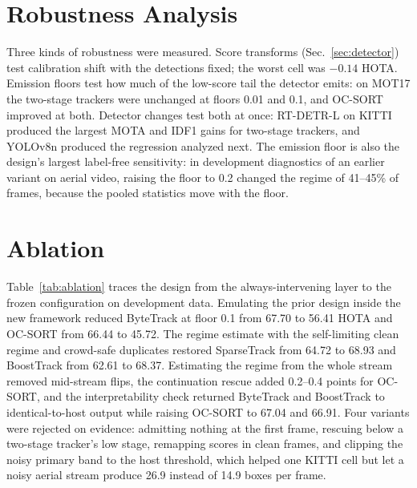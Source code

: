 \documentclass[journal]{new-aiaa}
\begin{document}
\section{Robustness Analysis}\label{sec:robust}
Three kinds of robustness were measured. Score transforms (Sec.~\ref{sec:detector}) test calibration shift with the detections fixed; the worst cell was $-0.14$ HOTA. Emission floors test how much of the low-score tail the detector emits: on MOT17 the two-stage trackers were unchanged at floors 0.01 and 0.1, and OC-SORT improved at both. Detector changes test both at once: RT-DETR-L on KITTI produced the largest MOTA and IDF1 gains for two-stage trackers, and YOLOv8n produced the regression analyzed next. The emission floor is also the design's largest label-free sensitivity: in development diagnostics of an earlier variant on aerial video, raising the floor to 0.2 changed the regime of 41--45\% of frames, because the pooled statistics move with the floor.

\section{Ablation}\label{sec:ablation}
Table~\ref{tab:ablation} traces the design from the always-intervening layer to the frozen configuration on development data. Emulating the prior design inside the new framework reduced ByteTrack at floor 0.1 from 67.70 to 56.41 HOTA and OC-SORT from 66.44 to 45.72. The regime estimate with the self-limiting clean regime and crowd-safe duplicates restored SparseTrack from 64.72 to 68.93 and BoostTrack from 62.61 to 68.37. Estimating the regime from the whole stream removed mid-stream flips, the continuation rescue added 0.2--0.4 points for OC-SORT, and the interpretability check returned ByteTrack and BoostTrack to identical-to-host output while raising OC-SORT to 67.04 and 66.91. Four variants were rejected on evidence: admitting nothing at the first frame, rescuing below a two-stage tracker's low stage, remapping scores in clean frames, and clipping the noisy primary band to the host threshold, which helped one KITTI cell but let a noisy aerial stream produce 26.9 instead of 14.9 boxes per frame.
\end{document}
